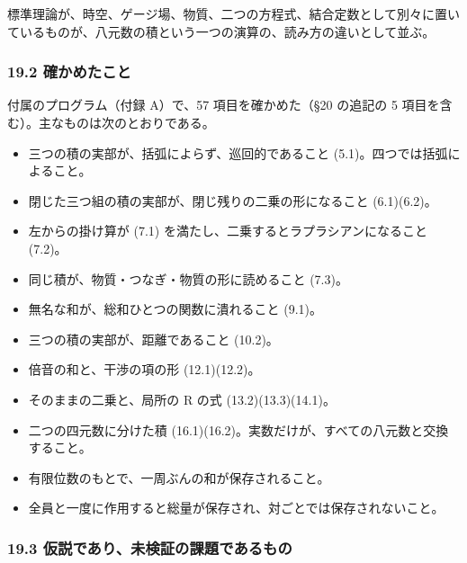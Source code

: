 \documentclass[
  a4paper,
]{ltjsarticle}
\providecommand{\tightlist}{%
  \setlength{\itemsep}{0pt}\setlength{\parskip}{0pt}}
\begin{document}
標準理論が、時空、ゲージ場、物質、二つの方程式、結合定数として別々に置いているものが、八元数の積という一つの演算の、読み方の違いとして並ぶ。

\subsubsection{19.2
確かめたこと}\label{ux78baux304bux3081ux305fux3053ux3068}

付属のプログラム（付録 A）で、57 項目を確かめた（§20 の追記の 5
項目を含む）。主なものは次のとおりである。

\begin{itemize}
\tightlist
\item
  三つの積の実部が、括弧によらず、巡回的であること
  (5.1)。四つでは括弧によること。
\item
  閉じた三つ組の積の実部が、閉じ残りの二乗の形になること (6.1)(6.2)。
\item
  左からの掛け算が (7.1) を満たし、二乗するとラプラシアンになること
  (7.2)。
\item
  同じ積が、物質・つなぎ・物質の形に読めること (7.3)。
\item
  無名な和が、総和ひとつの関数に潰れること (9.1)。
\item
  三つの積の実部が、距離であること (10.2)。
\item
  倍音の和と、干渉の項の形 (12.1)(12.2)。
\item
  そのままの二乗と、局所の R の式 (13.2)(13.3)(14.1)。
\item
  二つの四元数に分けた積
  (16.1)(16.2)。実数だけが、すべての八元数と交換すること。
\item
  有限位数のもとで、一周ぶんの和が保存されること。
\item
  全員と一度に作用すると総量が保存され、対ごとでは保存されないこと。
\end{itemize}

\subsubsection{19.3
仮説であり、未検証の課題であるもの}\label{ux4eeeux8aacux3067ux3042ux308aux672aux691cux8a3cux306eux8ab2ux984cux3067ux3042ux308bux3082ux306e}
\end{document}
